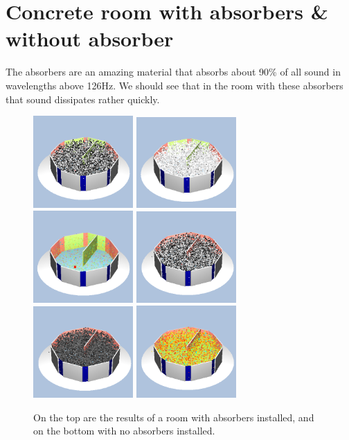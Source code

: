 \documentclass{thesis}
\begin{document}
\section{Concrete room with absorbers \& without absorber }
The absorbers are an amazing material that absorbs about 90\% of all sound in wavelengths above 126Hz. We should see that in the room with these absorbers that sound dissipates rather quickly. 
\begin{figure}
        \centering
        \includegraphics[width=1.5in]{images/freq_abs}
        \includegraphics[width=1.5in]{images/intensity_abs}
        \includegraphics[width=1.5in]{images/hybridVis_abs}
        \includegraphics[width=1.5in]{images/freq_noabs}
        \includegraphics[width=1.5in]{images/intensity_noabs}
        \includegraphics[width=1.5in]{images/hybridVis_noabs}
        \caption{On the top are the results of a room with absorbers installed, and on the bottom with no absorbers installed.}
\end{figure}
\end{document}
